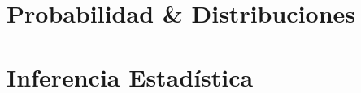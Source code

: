 \documentclass[10pt,draft]{book}
\begin{document}
%
\begin{titlepage}
	
\end{titlepage}	
%
\thispagestyle{empty}
\frontmatter

\begin{center}
\begin{minipage}{.7\textwidth}
\tableofcontents
\end{minipage}
\end{center}

%
\mainmatter
\part{Probabilidad \& Distribuciones}


\part{Inferencia Estadística}
%
\backmatter
\printbibliography[
heading=bibintoc,
title={Referencias}
]
\end{document}
